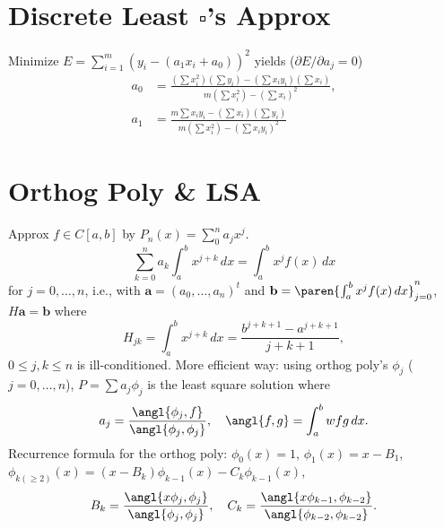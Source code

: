 \documentclass[b4paper,10pt]{memoir}
\begin{document}
\begin{multicols*}{3}
    \setcounter{chapter}{8}
    \setcounter{section}{0}
    \section{Discrete Least $\square$'s Approx}
    \s Minimize
    $E=\sum_{i=1}^m (y_i - (a_1 x_i + a_0))^2$
    yields ($\partial E/\partial a_j=0$)
    \begin{align*}
        a_0 & = \frac{(\sum x_i^2)(\sum y_i) - (\sum x_iy_i)(\sum x_i)}{m(\sum x_i^2) - (\sum x_i)^2}, \\
        a_1 & = \frac{m\sum x_iy_i - (\sum x_i)(\sum y_i)}{m(\sum x_i^2) - (\sum x_iy_i)^2}
    \end{align*}

    \section{Orthog Poly \& LSA}
    \s Approx $f\in C[a,b]$ by $P_n(x) = \sum_0^n a_j x^j$.
    \[ \sum_{k=0}^n a_k \int_a^b x^{j+k}\,dx = \int_a^b x^j f(x)\,dx\]
    for $ j=0,\dots,n $, i.e., with $\mathbf a = (a_0,\dots,a_n)^t$ and $\mathbf b = \paren{\int_a^b x^j f(x)\,dx}_{j=0}^n$, $H\mathbf a = \mathbf b$ where
    \[ H_{jk} = \int_a^b x^{j+k}\,dx=\frac{b^{j+k+1} - a^{j+k+1}}{j+k+1},\]
    $ 0\le j,k\le n$ is ill-conditioned.\nl
    \s More efficient way: using orthog poly's $\phi_j$ ($j=0,\dots,n$), $P = \sum a_j\phi_j$ is the least square solution where
    \[ a_j = \frac{\angl{\phi_j, f}}{\angl{\phi_j, \phi_j}},\quad \angl{f,g}  = \int_a^b wfg \,dx.\]
    \s Recurrence formula for the orthog poly: $\phi_0(x) = 1$, $\phi_1(x) = x - B_1$, $\phi_{k(\ge 2)}(x) = (x-B_k)\phi_{k-1}(x) - C_k \phi_{k-1}(x)$,
    \[ B_k = \frac{\angl{x\phi_j,\phi_j}}{\angl{\phi_j,\phi_j}},\quad C_k = \frac{\angl{x\phi_{k-1},\phi_{k-2}}} {\angl{\phi_{k-2},\phi_{k-2}}} .\]


\end{multicols*}
\end{document}

